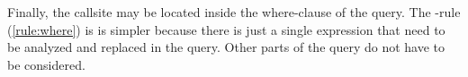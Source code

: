 \iffalse
\begin{figure}[h!]
    \centering\footnotesize
  \makebox[\textwidth][c]{
$$\inferrule{
    \exists i \in \{1, ..., n\}: \hasCallsite(T, e_{f_i}) \\
    \neg \hasCallsite(T, ts)\\
    \neg \hasCallsite(T, w) \\\\
    \forall i \in \{1, ..., n\}: T, \varnothing \vdash (\TRUE, t_i) \rightarrow (B_i, R_i)
}{
T, \varnothing \vdash (p, \SELECT~ ts ~\FROM~ t_1 \AS a_1 \otimes ... \otimes  t_n \AS a_n ~\WHERE~ w) \rightarrow \\\\
{\begin{tabular}[b]{LLLL}
         \Big( \big\{ (\SELECT~ p ~\AND~ p_1 ~\AND~ \cdots ~\AND~ p_n,~ \SELECT~ ts ~\FROM~ t'_1 \AS a_1 \otimes ... \otimes  t'_n \AS a_n ~\WHERE~ w ~~)\\
\phantom{\Big( \big\{}| ~((p_1, t'_1), ..., (p_n, t'_n)) \in \times_{\{i|1\leq i \leq n\}} B_i \hspace*{80mm}\big\}, \\
\phantom{\Big(}\big\{ (\SELECT~ p ~\AND~ p_1 ~\AND~ \cdots ~\AND~ p_n,~ \SELECT~ ts ~\FROM~ t'_1 \AS a_1 \otimes ... \otimes  t'_n \AS a_n ~\WHERE~ w ~~)\\
\phantom{\Big( \big\{}| ~ ((p_1, t'_1), ..., (p_n, t'_n)) \in \times_{\{i|1\leq i \leq n\}} (B_i \cup R_i), \exists t' \in \{t'_1, ..., t'_n\} : \hasCallsite(t') \hspace*{17mm}\big\}\Big)\\
\end{tabular}}
}
\quad(\textsc{from})
$$
}
    \caption{\RFROM-rule}
    \label{rule:from}
\end{figure}
\fi

Finally, the callsite may be located inside the where-clause of the query. The \RWHERE-rule (\autoref{rule:where}) is is simpler because there is just a single expression that need to be analyzed and replaced in the query. Other parts of the query do not have to be considered.



